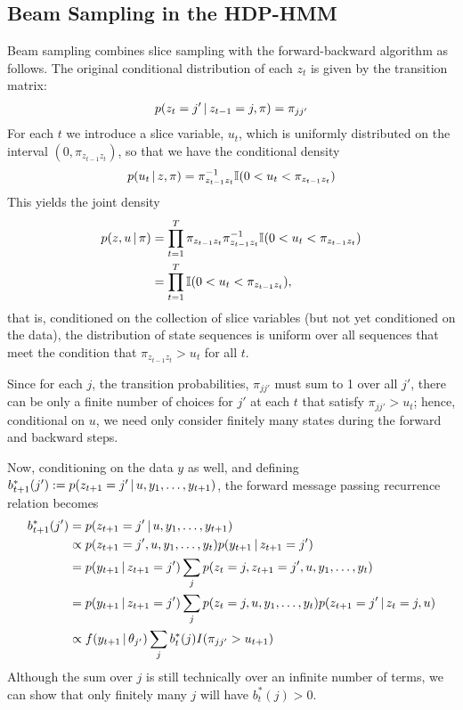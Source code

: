 \subsection{Beam Sampling in the HDP-HMM}

Beam sampling \citep{vangael2008beam} combines slice sampling with the
forward-backward algorithm as follows.  The original conditional
distribution of each $z_t$ is given by the transition matrix:
\begin{align}
  p(z_t = j' \, \vert \, z_{t-1} = j, \pi) = \pi_{jj'}
\end{align}
For each $t$ we introduce a slice variable, $u_t$, which is uniformly
distributed on the interval $(0, \pi_{z_{t-1}z_t})$, so that we have
the conditional density
\begin{align}
  p(u_t \, \vert \, z, \pi) = \pi_{z_{t-1}z_t}^{-1} \mathbb{I}(0 < u_t < \pi_{z_{t-1}z_t})
\end{align}
This yields the joint density
\begin{align}
  p(z, u \, \vert \, \pi) &= \prod_{t=1}^T \pi_{z_{t-1}z_t}
  \pi_{z_{t-1}z_t}^{-1} \mathbb{I}(0 < u_t < \pi_{z_{t-1}z_t})\\
  &= \prod_{t=1}^T \mathbb{I}(0 < u_t < \pi_{z_{t-1}z_t}),
\end{align}
that is, conditioned on the collection of slice variables (but not yet
conditioned on the data), the distribution of state sequences is
uniform over all sequences that meet the condition that
$\pi_{z_{t-1}z_t} > u_t$ for all $t$.

Since for each $j$, the transition probabilities, $\pi_{jj'}$ must sum
to 1 over all $j'$, there can be only a finite number of choices for
$j'$ at each $t$ that satisfy $\pi_{jj'} > u_t$; hence, conditional on
$u$, we need only consider finitely many states during the forward and
backward steps.

Now, conditioning on the data $y$ as well, and defining
$b^*_{t+1}(j') := p(z_{t+1} = j' \, \vert \, u, y_1, \dots, y_{t+1})$, 
the forward message passing recurrence relation becomes
\begin{align}
  b^*_{t+1}(j') &= p(z_{t+1} = j' \, \vert \, u, y_1, \dots, y_{t+1})\\
  &\propto p(z_{t+1} = j', u, y_1, \dots, y_{t}) p(y_{t+1} \, \vert \, z_{t+1} = j') \\
  &= p(y_{t+1} \, \vert \, z_{t+1} = j') \sum_{j} p(z_{t} = j, z_{t+1} = j', u, y_1, \dots, y_{t}) \\
  &= p(y_{t+1} \, \vert \, z_{t+1} = j') \sum_{j} p(z_{t} = j, u, y_1, \dots, y_{t})
  p(z_{t+1}  = j' \, \vert \, z_{t} = j, u) \\
  &\propto f(y_{t+1} \, \vert \, \theta_{j'}) \sum_{j} b^*_{t}(j) I(\pi_{jj'} > u_{t+1}) 
\end{align}
Although the sum over $j$ is still technically over an infinite number
of terms, we can show that only finitely many $j$ will have
$b^*_{t}(j) > 0$.

